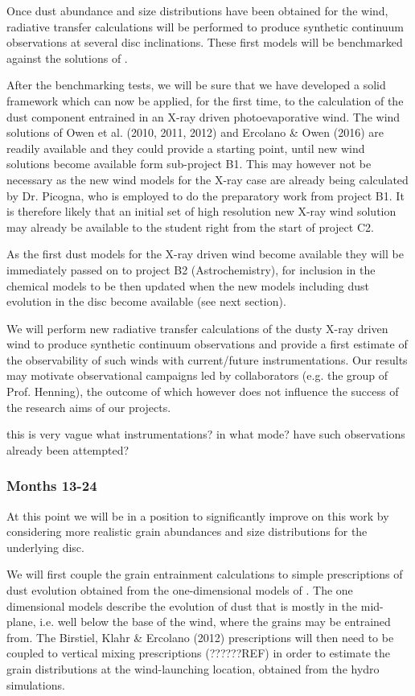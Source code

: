\documentclass[10pt,fleqn,twoside]{article}
\begin{document}
Once dust abundance and size distributions have been obtained for the
wind, radiative transfer calculations will be performed to produce
synthetic continuum observations at several disc inclinations. 
These first models will be benchmarked against the solutions
of \citet{2011MNRAS.411.1104O}.

After the benchmarking tests, we will be sure that we have developed a
solid framework which can now be applied, for the
first time, to the calculation of the dust component entrained in an
X-ray driven photoevaporative wind. The wind solutions of Owen et
al. (2010, 2011, 2012) and Ercolano \& Owen (2016) are readily
available and they could provide a starting point, until new 
wind solutions become available form sub-project B1. This may however
not be necessary as the new wind models for the X-ray case
are already being calculated by Dr. Picogna, who is employed to do the
preparatory work from project B1. It is therefore likely that an
initial set of high resolution new X-ray wind solution may already be
available to the student right from the start of project C2.
 
As the first dust models for the X-ray driven wind become available
they will be immediately passed on to project B2 (Astrochemistry), for
inclusion in the chemical models to be then updated when the new
models including dust evolution in the disc become available (see next
section). 

We will perform new radiative transfer calculations of the dusty
X-ray driven wind to produce synthetic continuum observations and
provide a first estimate of the observability of such winds with
current/future instrumentations. Our results may motivate
observational campaigns led by collaborators (e.g. the group of
Prof. Henning), the outcome of which however does not influence the
success of the research aims of our projects. 

 {\color{red} this is very vague what
  instrumentations? in what mode? have such observations already been
  attempted?}


\subsubsection{Months 13-24}
 
At this point we will be in a position to significantly improve on
this work by considering more realistic grain abundances and size
distributions for the underlying disc. 

We will first couple the grain entrainment calculations to simple
prescriptions of dust  evolution \citep[e.g.,][]{2012A&A...539A.148B}
obtained from the one-dimensional models of
\citet{2010A&A...513A..79B}. The one dimensional models describe the
evolution of dust that is mostly in the mid-plane, i.e. well below the
base of the wind, where the grains may be entrained from. The
Birstiel, Klahr \& Ercolano (2012) prescriptions will then need to be
coupled to vertical mixing prescriptions (??????REF) in order to
estimate the grain distributions at the wind-launching location,
obtained from the hydro simulations. 
\end{document}
